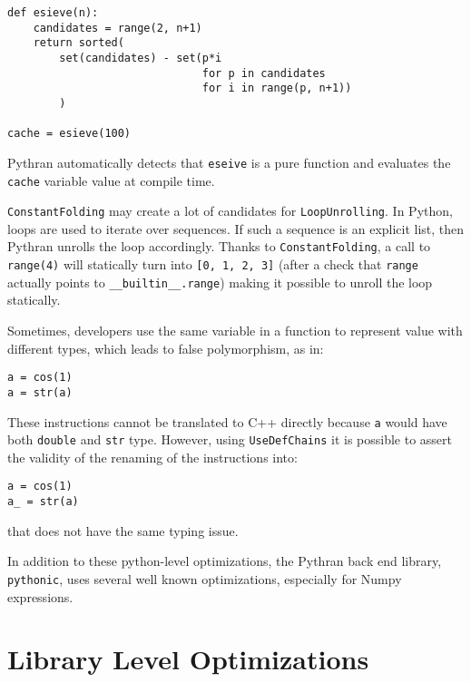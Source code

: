 \documentclass[10pt, onecolumn, preprint]{sigplanconf}
\begin{document}
\begin{lstlisting}
def esieve(n):
    candidates = range(2, n+1)
    return sorted(
        set(candidates) - set(p*i
                              for p in candidates
                              for i in range(p, n+1))
        )

cache = esieve(100)
\end{lstlisting}

Pythran automatically detects that \texttt{eseive} is a pure function and evaluates
the \texttt{cache} variable value at compile time.

\texttt{ConstantFolding} may create a lot of candidates for 
\texttt{LoopUnrolling}. In Python, loops are used to iterate over sequences. If
such a sequence is an explicit list, then Pythran unrolls the loop accordingly.
Thanks to \texttt{ConstantFolding}, a call to \texttt{range(4)} will statically
turn into \texttt{[0, 1, 2, 3]} (after a check that \texttt{range} actually
points to \texttt{\_\_builtin\_\_.range}) making it possible to unroll the loop
statically.

Sometimes, developers use the same variable in a function to represent value 
with different types, which leads to false polymorphism, as in:

\begin{lstlisting}
a = cos(1)
a = str(a)
\end{lstlisting}

These instructions cannot be translated to C++ directly because \texttt{a}
would have both \texttt{double} and \texttt{str} type. However, using
\texttt{UseDefChains} it is possible to assert the validity of the renaming of
the instructions into:


\begin{lstlisting}
a = cos(1)
a_ = str(a)
\end{lstlisting}

that does not have the same typing issue.

In addition to these python-level optimizations, the Pythran back end library,
\texttt{pythonic}, uses several well known optimizations, especially for Numpy
expressions.

\section{Library Level Optimizations}
\label{sec:backend}
\end{document}
